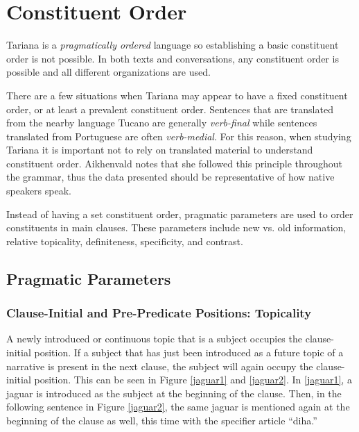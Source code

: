 \documentclass{article}
\begin{document}

\section{Constituent Order} \label{Constituent Order}
Tariana is a \textit{pragmatically ordered} language so establishing a basic constituent order is not possible. In both texts and conversations, any constituent order is possible and all different organizations are used.

There are a few situations when Tariana may appear to have a fixed constituent order, or at least a prevalent constituent order. Sentences that are translated from the nearby language Tucano are generally \textit{verb-final} while sentences translated from Portuguese are often \textit{verb-medial}. For this reason, when studying Tariana it is important not to rely on translated material to understand constituent order. Aikhenvald notes that she followed this principle throughout the grammar, thus the data presented should be representative of how native speakers speak.

Instead of having a set constituent order, pragmatic parameters are used to order constituents in main clauses. These parameters include new vs. old information, relative topicality, definiteness, specificity, and contrast.

\subsection{Pragmatic Parameters}
\subsubsection{Clause-Initial and Pre-Predicate Positions: Topicality} %
A newly introduced or continuous topic that is a subject occupies the clause-initial position. If a subject that has just been introduced as a future topic of a narrative is present in the next clause, the subject will again occupy the clause-initial position. This can be seen in Figure \ref*{jaguar1} and \ref*{jaguar2}. In \ref*{jaguar1}, a jaguar is introduced as the subject at the beginning of the clause. Then, in the following sentence in Figure \ref*{jaguar2}, the same jaguar is mentioned again at the beginning of the clause as well, this time with the specifier article ``diha.''
\end{document}
